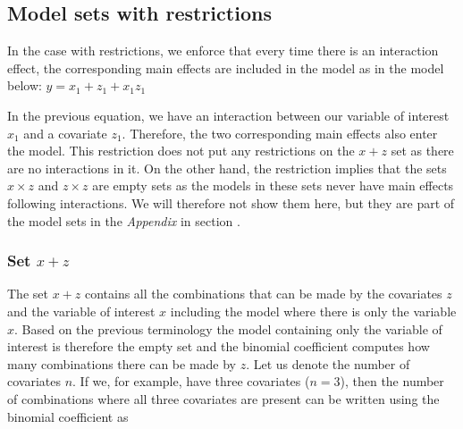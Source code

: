 \subsection{Model sets with restrictions}
\label{with_res}
In the case with restrictions, we enforce that every time there is an interaction effect, the corresponding main effects are included in the model as in the model below:
$y=x_1+z_1+x_1z_1$ 

In the previous equation, we have an interaction between our variable of interest $x_1$ and a covariate $z_1$. Therefore, the two corresponding main effects also enter the model. This restriction does not put any restrictions on the $x + z$ set as there are no interactions in it. On the other hand, the restriction implies that the sets $x \times z$ and $z \times z$ are empty sets as the models in these sets never have main effects following interactions. We will therefore not show them here, but they are part of the model sets in the \textit{Appendix} in section .

\subsubsection{Set $x + z$}
The set $x + z$ contains all the combinations that can be made by the covariates $z$ and the variable of interest $x$ including the model where there is only the variable $x$. Based on the previous terminology the model containing only the variable of interest is therefore the empty set and the binomial coefficient computes how many combinations there can be made by $z$. Let us denote the number of covariates $n$. If we, for example, have three covariates ($n=3$), then the number of combinations where all three covariates are present can be written using the binomial coefficient as


